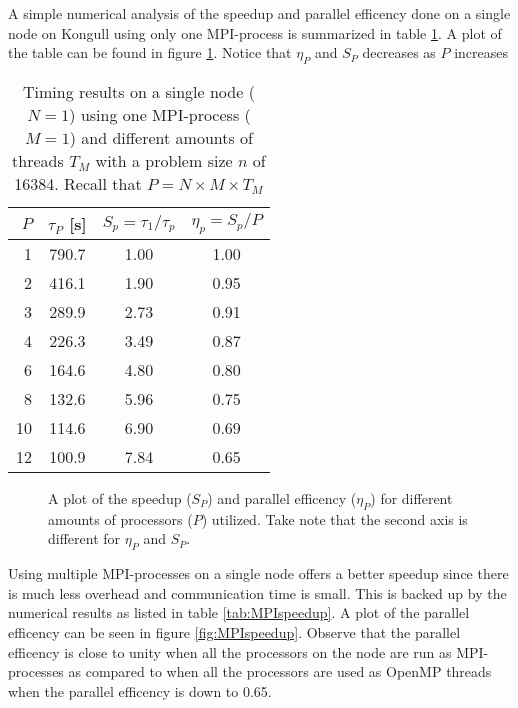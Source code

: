 \documentclass[11pt,a4paper,english]{article}
\numberwithin{figure}{subsection}
\numberwithin{table}{subsection}
\begin{document}
A simple numerical analysis of the speedup and parallel efficency done on a single node on Kongull using only one MPI-process is summarized in table \ref{tab:nodespeedup}. A plot of the table can be found in figure \ref{fig:nodespeed}. Notice that $\eta_P$ and $S_P$ decreases as $P$ increases  
\begin{table}[htbp]
	\centering
	\caption{Timing results on a single node ($N=1$) using one MPI-process ($M=1$) and different amounts of threads $T_M$ with a problem size $n$ of 16384. Recall that $P=N\times M\times T_M$}
	\label{tab:nodespeedup}
	\begin{tabular}{r|c|c|c}
	$P$	&$\tau_P$ [s]	&	$S_p=\tau_1/\tau_p$	&	$\eta_p=S_p/P$	\\
\hline
	1	&	790.7	&	1.00	&	1.00	\\
	2	&	416.1	&	1.90	&	0.95	\\
	3	&	289.9	&	2.73	&	0.91	\\
	4	&	226.3	&	3.49	&	0.87	\\
	6	&	164.6	&	4.80	&	0.80	\\
	8	&	132.6	&	5.96	&	0.75	\\
	10	&	114.6	&	6.90	&	0.69	\\
	12	&	100.9	&	7.84	&	0.65	\\
	\end{tabular}
\end{table}

\begin{figure}[htbp]
	\centering
	
	\caption{A plot of the speedup ($S_P$) and parallel efficency ($\eta_P$) for different amounts of processors ($P$) utilized. Take note that the second axis is different for $\eta_P$ and $S_P$.}
	\label{fig:nodespeed}
\end{figure}

Using multiple MPI-processes on a single node offers a better speedup since there is much less overhead and communication time is small. This is backed up by the numerical results as listed in table \ref{tab:MPIspeedup}. A plot of the parallel efficency can be seen in figure \ref{fig:MPIspeedup}. Observe that the parallel efficency is close to unity when all the processors on the node are run as MPI-processes as compared to when all the processors are used as OpenMP threads when the parallel efficency is down to 0.65.
\end{document}
